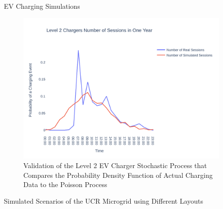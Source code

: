 \documentclass[final, 20 pt]{beamer}
\newlength{\onecolwid}
\begin{document}
\begin{frame}[t]
\begin{columns}[t]
\begin{column}{\onecolwid}
\begin{block}{EV Charging Simulations}
	\begin{figure}
		\centering
		\includegraphics[width=\linewidth]{Fig/l2_avg_day_rand_poisson_1_hour_pdf}
		\caption{\footnotesize Validation of the Level 2 EV Charger Stochastic Process that Compares the Probability Density Function of Actual Charging Data to the Poisson Process}
		\label{fig:l2avgdayrandpoisson1hourpdf}
	\end{figure}
	
\end{block}
\begin{block}{Simulated Scenarios of the UCR Microgrid using Different Layouts}
	
	\begin{table}
		\caption{Simulated Scenarios of the UCR Microgrid using Different Layouts}
		\scriptsize
		
		\label{tab:scenarios}
	\end{table}
	
\end{block}


\end{column} %





\begin{column}{\onecolwid} %



\end{column}
\end{columns}
\end{frame}
\end{document}
